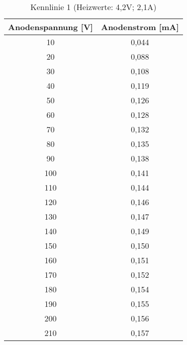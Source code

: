 \begin{table}[h!]
	\begin{center}
		\begin{tabular}{cc}
			Anodenspannung [V] & Anodenstrom [mA]\\ \hline
			10	&0,044\\
			20	&0,088\\
			30	&0,108\\
			40	&0,119\\
			50	&0,126\\
			60	&0,128\\
			70	&0,132\\
			80	&0,135\\
			90	&0,138\\
			100	&0,141\\
			110	&0,144\\
			120	&0,146\\
			130	&0,147\\
			140	&0,149\\
			150	&0,150\\
			160	&0,151\\
			170	&0,152\\
			180	&0,154\\
			190	&0,155\\
			200	&0,156\\
			210	&0,157
		\end{tabular}
		\caption{Kennlinie 1 (Heizwerte: 4,2V; 2,1A)}
		\label{taba1}
	\end{center}
\end{table}